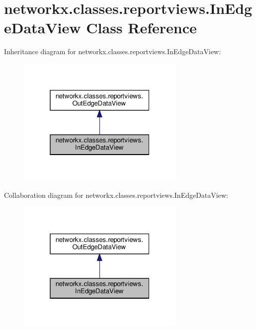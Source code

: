\hypertarget{classnetworkx_1_1classes_1_1reportviews_1_1InEdgeDataView}{}\section{networkx.\+classes.\+reportviews.\+In\+Edge\+Data\+View Class Reference}
\label{classnetworkx_1_1classes_1_1reportviews_1_1InEdgeDataView}


Inheritance diagram for networkx.\+classes.\+reportviews.\+In\+Edge\+Data\+View\+:
\nopagebreak
\begin{figure}[H]
\begin{center}
\leavevmode
\includegraphics[width=229pt]{classnetworkx_1_1classes_1_1reportviews_1_1InEdgeDataView__inherit__graph}
\end{center}
\end{figure}


Collaboration diagram for networkx.\+classes.\+reportviews.\+In\+Edge\+Data\+View\+:
\nopagebreak
\begin{figure}[H]
\begin{center}
\leavevmode
\includegraphics[width=229pt]{classnetworkx_1_1classes_1_1reportviews_1_1InEdgeDataView__coll__graph}
\end{center}
\end{figure}
